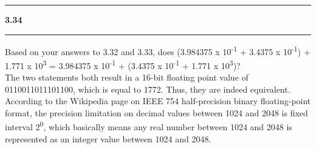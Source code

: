 \documentclass[11pt]{article}
\newcommand\question[2]{\vspace{.25in}\hrule\textbf{#1 #2}\vspace{.5em}\hrule\vspace{.10in}}
\begin{document}
\question{3.34}{} 
Based on your answers to 3.32 and 3.33, does (3.984375 x 10\textsuperscript{-1} + 3.4375 x 10\textsuperscript{-1}) + 1.771 x 10\textsuperscript{3} = 3.984375 x 10\textsuperscript{-1} + (3.4375 x 10\textsuperscript{-1} + 1.771 x 10\textsuperscript{3})?\\[1em]

The two statements both result in a 16-bit floating point value of 0110011011101100, which is equal to 1772. Thus, they are indeed equivalent. According to the Wikipedia page on IEEE 754 half-precision binary floating-point format, the precision limitation on decimal values between 1024 and 2048 is fixed interval 2\textsuperscript{0}, which basically means any real number between 1024 and 2048 is represented as an integer value between 1024 and 2048.
\end{document}
